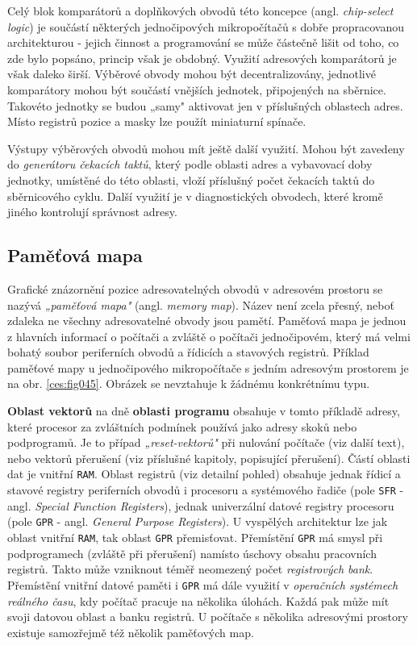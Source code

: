       Celý blok komparátorů a doplňkových obvodů této koncepce (angl. \emph{chip-select logic}) je 
      součástí některých jednočipových mikropočítačů s dobře propracovanou architekturou - jejich 
      činnost a programování se může částečně lišit od toho, co zde bylo popsáno, princip však je 
      obdobný. Využití adresových komparátorů je však daleko širší. Výběrové obvody mohou být 
      decentralizovány, jednotlivé komparátory mohou být součástí vnějších jednotek, připojených na 
      sběrnice. Takovéto jednotky se budou „samy" aktivovat jen v příslušných oblastech adres. 
      Místo registrů pozice a masky lze použít miniaturní spínače.
      
      Výstupy výběrových obvodů mohou mít ještě další využití. Mohou být zavedeny do 
      \emph{generátoru čekacích taktů}, který podle oblasti adres a vybavovací doby jednotky, 
      umístěné do této oblasti, vloží příslušný počet čekacích taktů do sběrnicového cyklu. Další 
      využití je v diagnostických obvodech, které kromě jiného kontrolují správnost adresy.
    
    \subsection{Paměťová mapa}
      Grafické znázornění pozice adresovatelných obvodů v adresovém prostoru se nazývá 
      \emph{„paměťová mapa"} (angl. \emph{memory map}). Název není zcela přesný, neboť zdaleka ne 
      všechny adresovatelné obvody jsou pamětí. Paměťová mapa je jednou z hlavních informací o 
      počítači a zvláště o počítači jednočipovém, který má velmi bohatý soubor periferních obvodů a 
      řídicích a stavových registrů. Příklad paměťové mapy u jednočipového mikropočítače s jedním 
      adresovým prostorem je na obr. \ref{ces:fig045}. Obrázek se nevztahuje k žádnému 
      konkrétnímu typu.
      
      \textbf{Oblast vektorů} na dně \textbf{oblasti programu} obsahuje v tomto příkladě adresy, 
      které procesor za zvláštních podmínek používá jako adresy skoků nebo podprogramů. Je to 
      případ \emph{„reset-vektorů"} při nulování počítače (viz další text), nebo vektorů přerušení 
      (viz příslušné kapitoly, popisující přerušení). Částí oblasti dat je vnitřní \texttt{RAM}. 
      Oblast registrů (viz detailní pohled) obsahuje jednak řídicí a stavové registry periferních 
      obvodů i procesoru a systémového řadiče (pole \texttt{SFR} - angl. \emph{Special Function 
      Registers}), jednak univerzální datové registry procesoru (pole \texttt{GPR} - angl. 
      \emph{General Purpose Registers}). U vyspělých architektur lze jak oblast vnitřní 
      \texttt{RAM}, tak oblast \texttt{GPR} přemisťovat. Přemístění \texttt{GPR} má smysl při 
      podprogramech (zvláště při přerušení) namísto úschovy obsahu pracovních registrů. Takto může 
      vzniknout téměř neomezený počet \emph{registrových bank}. Přemístění vnitřní datové paměti i 
      \texttt{GPR} má dále využití v \emph{operačních systémech reálného času}, kdy počítač 
      pracuje na několika úlohách. Každá pak může mít svoji datovou oblast a banku registrů. U 
      počítače s několika adresovými prostory existuje samozřejmě též několik paměťových map.
      
